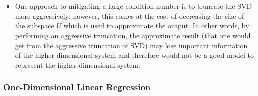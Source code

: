 \documentclass[11.5pt,a4paper]{article}
\makeatletter
\newenvironment{conditions}
  {\par\vspace{\abovedisplayskip}\noindent\begin{tabular}{>{$}l<{$} @{${}={}$} l}}
  {\end{tabular}\par\vspace{\belowdisplayskip}}
\makeatother
\begin{document}
\begin{itemize}
\begin{itemize}
\begin{conditions}
            \sigma_{min}x & $b$ \\
            \sigma_{max}\epsilon_x & $\epsilon_b$
        \end{conditions}
        \item From the above equation, the output signal-to-noise ratio ($\frac{b}{\epsilon_b}$) is equal to $\frac{x}{\epsilon_x} \cdot \frac{\sigma_{min}}{\sigma_{max}}$. This shows that the output signal-to-noise ratio is degraded by a factor equal to the condition number (under the worst case scenario).
        \item If we assume the worst case scenario when solving for $x$ given an imperfect $b$, where $\epsilon_b$ is aligned with the singular vector corresponding to the max singular value $\sigma_{max}$ and $b$ is aligned with the singular vector corresponding to the min singular value $\sigma_{min}$
        \begin{equation*}
            x + \epsilon_x \approx A^{-1}\left( b + \epsilon_b \right) = \frac{1}{\sigma_{max}}b + \frac{1}{\sigma_{min}}\epsilon_b
        \end{equation*}

        As we can see here, the input signal-to-noise ratio (as we are solving for $x$ in this scenario) is degraded by a factor equal to the condition number.
    \end{itemize}
    \item One approach to mitigating a large condition number is to truncate the SVD more aggressively; however, this comes at the cost of decreasing the size of the subspace $\tilde{U}$ which is used to approximate the output. In other words, by performing an aggressive truncation, the approximate result (that one would get from the aggressive truncation of SVD) may lose important information of the higher dimensional system and therefore would not be a good model to represent the higher dimensional system.
\end{itemize}

\subsubsection*{One-Dimensional Linear Regression}
\end{document}
